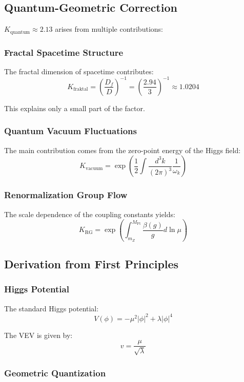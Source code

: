 \documentclass[12pt,a4paper]{article}
\begin{document}
	\subsection{Quantum-Geometric Correction}
	
	$K_{\text{quantum}} \approx 2.13$ arises from multiple contributions:
	
	\subsubsection{Fractal Spacetime Structure}
	
	The fractal dimension of spacetime contributes:
	\[
	K_{\text{fraktal}} = \left(\frac{D_f}{D}\right)^{-1} = \left(\frac{2.94}{3}\right)^{-1} \approx 1.0204
	\]
	
	This explains only a small part of the factor.
	
	\subsubsection{Quantum Vacuum Fluctuations}
	
	The main contribution comes from the zero-point energy of the Higgs field:
	\[
	K_{\text{vacuum}} = \exp\left(\frac{1}{2}\int \frac{d^3k}{(2\pi)^3} \frac{1}{\omega_k}\right)
	\]
	
	\subsubsection{Renormalization Group Flow}
	
	The scale dependence of the coupling constants yields:
	\[
	K_{\text{RG}} = \exp\left(\int_{m_Z}^{M_{\text{Pl}}} \frac{\beta(g)}{g} d\ln\mu\right)
	\]
	
	\subsection{Derivation from First Principles}
	
	\subsubsection{Higgs Potential}
	
	The standard Higgs potential:
	\[
	V(\phi) = -\mu^2|\phi|^2 + \lambda|\phi|^4
	\]
	
	The VEV is given by:
	\[
	v = \frac{\mu}{\sqrt{\lambda}}
	\]
	
	\subsubsection{Geometric Quantization}
	
\end{document}
